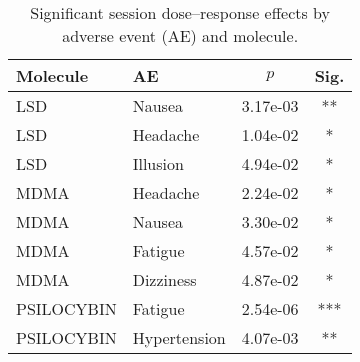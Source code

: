 \begin{table}[htbp]
  \centering
  \caption{Significant session dose--response effects by adverse event (AE) and molecule.}
  \label{tab:dr-ae-by-molecule-session}
  \begin{tabular}{llcc}
    \toprule
    Molecule & AE & $p$ & Sig. \\
    \midrule
    LSD & Nausea & 3.17e-03 & ** \\
    LSD & Headache & 1.04e-02 & * \\
    LSD & Illusion & 4.94e-02 & * \\
    MDMA & Headache & 2.24e-02 & * \\
    MDMA & Nausea & 3.30e-02 & * \\
    MDMA & Fatigue & 4.57e-02 & * \\
    MDMA & Dizziness & 4.87e-02 & * \\
    PSILOCYBIN & Fatigue & 2.54e-06 & *** \\
    PSILOCYBIN & Hypertension & 4.07e-03 & ** \\
    \bottomrule
  \end{tabular}
\end{table}
